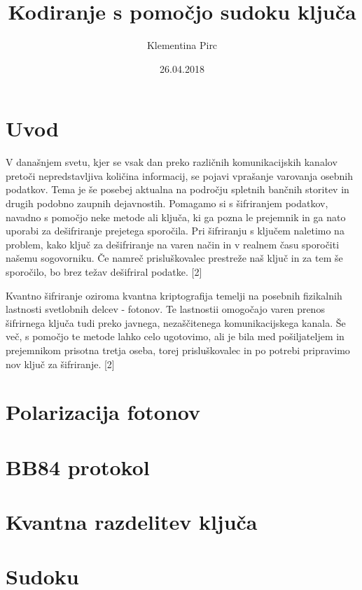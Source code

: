\documentclass[A4paper, 11pt]{article}
\title{Kodiranje s pomočjo sudoku ključa}
\author{Klementina Pirc}
\date{26.04.2018}
\begin{document}
\maketitle



\section{Uvod}

V današnjem svetu, kjer se vsak dan preko različnih komunikacijskih kanalov pretoči nepredstavljiva količina informacij, se pojavi vprašanje varovanja osebnih podatkov. Tema je še posebej aktualna na področju spletnih bančnih storitev in drugih podobno zaupnih dejavnostih. Pomagamo si s šifriranjem podatkov, navadno s pomočjo neke metode ali ključa, ki ga pozna le prejemnik in ga nato uporabi za dešifriranje prejetega sporočila. Pri šifriranju s ključem naletimo na problem, kako ključ za dešifriranje na varen način in v realnem času sporočiti našemu sogovorniku. Če namreč prisluškovalec prestreže naš ključ in za tem še sporočilo, bo brez težav dešifriral podatke. [2]

Kvantno šifriranje oziroma kvantna kriptografija temelji na posebnih fizikalnih lastnosti svetlobnih delcev - fotonov. Te lastnostii omogočajo varen prenos šifrirnega ključa tudi preko javnega, nezaščitenega komunikacijskega kanala. Še več, s pomočjo te metode lahko celo ugotovimo, ali je bila med pošiljateljem in prejemnikom prisotna tretja oseba, torej prisluškovalec in po potrebi pripravimo nov ključ za šifriranje. [2]



\section{Polarizacija fotonov}



\section{BB84 protokol}



\section{Kvantna razdelitev ključa}



\section{Sudoku}
\end{document}
